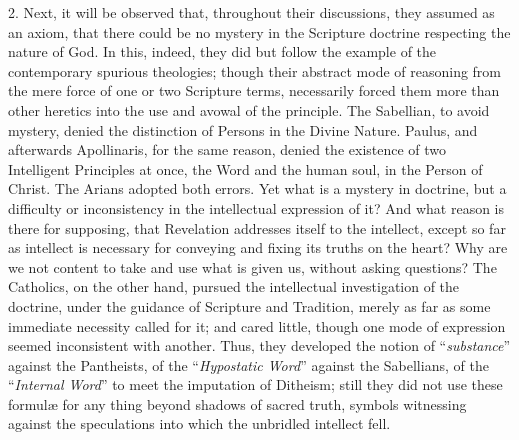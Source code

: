 2. Next, it will be observed that, throughout their discussions,
they assumed as an axiom, that there could be no mystery in the
Scripture doctrine respecting the nature of God. In this, indeed, they
did but follow the example of the contemporary spurious theologies;
though their abstract mode of reasoning from the mere force of one or
two Scripture terms, necessarily forced them more than other heretics
into the use and avowal of the principle. The Sabellian, to avoid
mystery, denied the distinction of Persons in the Divine Nature.
Paulus, and afterwards Apollinaris, for the same reason, denied the
existence of two Intelligent Principles at once, the Word and the
human soul, in the Person of Christ. The Arians adopted both errors.
Yet what is a mystery in doctrine, but a difficulty or inconsistency
in the intellectual expression of it? And what reason is there for
supposing, that Revelation addresses itself to the intellect, except
so far as intellect is necessary for conveying and fixing its truths
on the heart? Why are we not content to take and use what is given us,
without asking questions? The Catholics, on the other hand,
pursued the intellectual investigation of the doctrine, under the
guidance of Scripture and Tradition, merely as far as some immediate
necessity called for it; and cared little, though one mode of
expression seemed inconsistent with another. Thus, they developed the
notion of ``\emph{substance}'' against the Pantheists, of the
``\emph{Hypostatic Word}'' against the Sabellians, of the
``\emph{Internal Word}'' to meet the imputation of Ditheism;
still they did not use these formulæ for any thing beyond shadows of
sacred truth, symbols witnessing against the speculations into which
the unbridled intellect fell.

